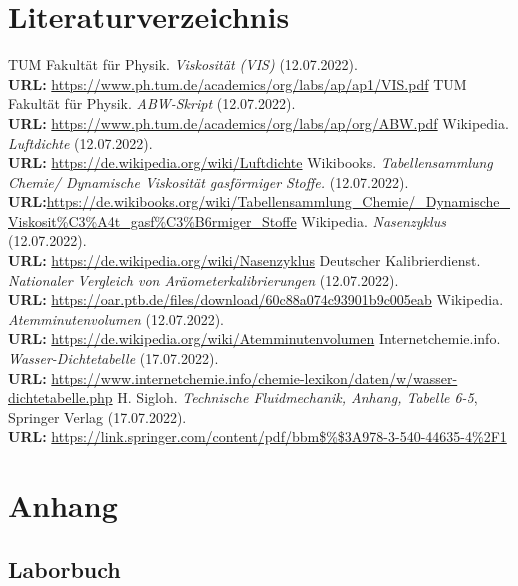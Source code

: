\documentclass{article}
\begin{document}
\section{Literaturverzeichnis}
\begin{thebibliography}{9}
TUM Fakultät für Physik. \emph{Viskosität (VIS)} (12.07.2022). \\
\textbf{URL:} \url{https://www.ph.tum.de/academics/org/labs/ap/ap1/VIS.pdf}
TUM Fakultät für Physik. \emph{ABW-Skript} (12.07.2022). \\
\textbf{URL:} \url{https://www.ph.tum.de/academics/org/labs/ap/org/ABW.pdf}
Wikipedia. \emph{Luftdichte} (12.07.2022). \\
\textbf{URL:} \url{https://de.wikipedia.org/wiki/Luftdichte}
Wikibooks. \emph{Tabellensammlung Chemie/ Dynamische Viskosität gasförmiger Stoffe.} (12.07.2022). \\
\textbf{URL:}\url{https://de.wikibooks.org/wiki/Tabellensammlung_Chemie/_Dynamische_Viskosit%C3%A4t_gasf%C3%B6rmiger_Stoffe}
Wikipedia. \emph{Nasenzyklus} (12.07.2022). \\
\textbf{URL:} \url{https://de.wikipedia.org/wiki/Nasenzyklus}
Deutscher Kalibrierdienst. \emph{Nationaler Vergleich von Aräometerkalibrierungen} (12.07.2022). \\
\textbf{URL:} \url{https://oar.ptb.de/files/download/60c88a074c93901b9c005eab}
Wikipedia. \emph{Atemminutenvolumen} (12.07.2022). \\
\textbf{URL:} \url{https://de.wikipedia.org/wiki/Atemminutenvolumen}
Internetchemie.info. \emph{Wasser-Dichtetabelle} (17.07.2022). \\
\textbf{URL:} \url{https://www.internetchemie.info/chemie-lexikon/daten/w/wasser-dichtetabelle.php}
H. Sigloh. \emph{Technische Fluidmechanik, Anhang, Tabelle 6-5}, Springer Verlag (17.07.2022). \\
\textbf{URL:} \url{https://link.springer.com/content/pdf/bbm$\%$3A978-3-540-44635-4%2F1}
\end{thebibliography}
\section{Anhang}
\subsection{Laborbuch}

\end{document}
